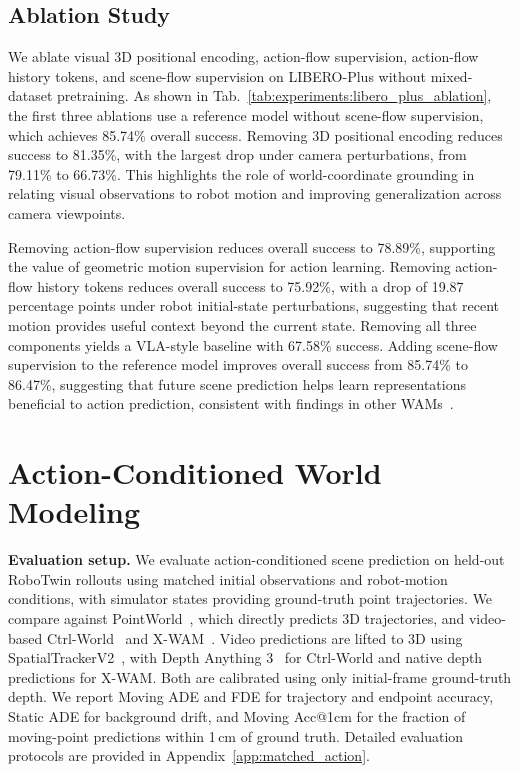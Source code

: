 \vspace{-0.2cm}

\subsection{Ablation Study}
\label{sec:experiments:ablations}
\vspace{-0.2cm}

We ablate visual 3D positional encoding, action-flow supervision,
action-flow history tokens, and scene-flow supervision on LIBERO-Plus without
mixed-dataset pretraining.
As shown in Tab.~\ref{tab:experiments:libero_plus_ablation},
the first three ablations use a reference model without scene-flow
supervision, which achieves 85.74\% overall success.
Removing 3D positional encoding reduces success to 81.35\%,
with the largest drop under camera perturbations, from 79.11\%
to 66.73\%. This highlights the role of world-coordinate grounding
in relating visual observations to robot motion and improving
generalization across camera viewpoints.

Removing action-flow supervision reduces overall success to 78.89\%,
supporting the value of geometric motion supervision for action
learning.
Removing action-flow history tokens reduces overall success to 75.92\%,
with a drop of 19.87 percentage points under robot initial-state
perturbations, suggesting that recent motion provides useful context
beyond the current state.
Removing all three components yields a VLA-style baseline with
67.58\% success. Adding scene-flow supervision to the reference model improves overall
success from 85.74\% to 86.47\%, suggesting that future scene prediction
helps learn representations beneficial to action prediction, consistent
with findings in other WAMs~\citep{yuan2026fastwam}.

\vspace{-0.3cm}

\section{Action-Conditioned World Modeling}
\label{sec:experiments:world_model}
\vspace{-0.2cm}

\noindent\textbf{Evaluation setup.}
We evaluate action-conditioned scene prediction on held-out RoboTwin
rollouts using matched initial observations and robot-motion conditions,
with simulator states providing ground-truth point trajectories.
We compare against PointWorld~\citep{huang2026pointworld}, which directly
predicts 3D trajectories, and video-based Ctrl-World~\citep{ctrlworld}
and X-WAM~\citep{guo2026xwam}. Video predictions are lifted to 3D using
SpatialTrackerV2~\citep{xiao2025spatialtrackerv2}, with
Depth Anything 3~\citep{lin2025depthanything3} for Ctrl-World and native
depth predictions for X-WAM. Both are calibrated using only initial-frame
ground-truth depth.
We report Moving ADE and FDE for trajectory and endpoint accuracy,
Static ADE for background drift, and Moving Acc@1cm for the fraction
of moving-point predictions within 1\,cm of ground truth.
Detailed evaluation protocols are provided in Appendix~\ref{app:matched_action}.

